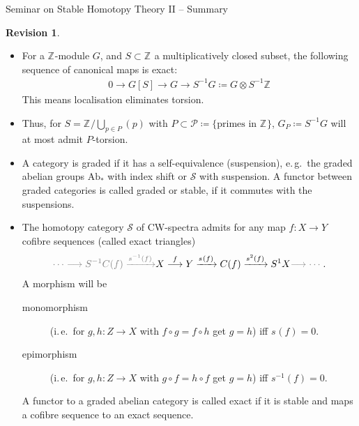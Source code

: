 \documentclass[english]{scrartcl}
\theoremstyle{definition}
\newtheorem*{Rev}{Revision}
\theoremstyle{remark}
\newcommand*{\idest}{i.\,e.\ }
\newcommand*{\forexample}{e.\,g.\ }
\newcommand*{\ifftext}{iff}
\newcommand*{\Z}[1][]{\mathds{Z}_{#1}}  %
\newcommand*{\longto}{\longrightarrow}
\newcommand*{\Cone}[1]{C(#1)}
\newcommand*{\Spectra}{\mathcal{S}} %
\newcommand*{\Sph}{S} %
\newcommand*{\susp}[2][1]{\Sph^{#1}#2}  %
\newcommand*{\conem}[2][]{s^{#1}(#2)}  %
\newcommand*{\Ps}{P}  %
\newcommand*{\PS}{\mathcal{P}} %
\newcommand*{\graded}[1]{#1_*}  %
\newcommand*{\Abgr}{\graded{\text{Ab}}}  %
\begin{document}
\clearpairofpagestyles
{}
\cfoot*{\pagemark}

\begin{center}
Seminar on Stable Homotopy Theory II – Summary\par
\end{center}
\smallskip


\begin{Rev}
  \begin{itemize}
  \item For a $\Z$-module $G$, and $S\subset\Z$ a multiplicatively
    closed subset, the following sequence of canonical maps is exact:
    \begin{gather*}
      0 \longto G[S] \longto G \longto S^{-1}G\coloneqq G\otimes
      S^{-1}\Z
    \end{gather*}
    This means localisation eliminates torsion.
  \item Thus, for $S=\Z/\bigcup_{p\in\Ps}(p)$ with
    $\Ps\subset\PS\coloneqq\{\text{primes in $\Z$}\}$,
    $G_P\coloneqq S^{-1}G$ will at most admit $P$-torsion.
  \item A category is graded if it has a self-equivalence
    (suspension), \forexample the graded abelian groups $\Abgr$ with
    index shift or $\Spectra$ with suspension. A functor between
    graded categories is called graded or stable, if it commutes with
    the suspensions.
  \item The homotopy category $\Spectra$ of CW-spectra admits for any
    map $f\colon X\to Y$ cofibre sequences (called exact triangles)
    \begin{gather*}
      {\color{gray} \dotsb \longto \susp[-1] \Cone f
        \xrightarrow{\conem[-1] f} } X \overset f \longrightarrow Y
      \xrightarrow{\conem f} \Cone f \xrightarrow{\conem[2]f} \susp X
      {\color{gray} \longto \dotsb } \;.
    \end{gather*}
    A morphism will be
    \begin{description}
    \item[monomorphism] (\idest for $g,h\colon Z\to X$ with
      $f\circ g=f\circ h$ get $g=h$) \ifftext{} $\conem f=0$.
    \item[epimorphism] (\idest for $g,h\colon Z\to X$ with
      $g\circ f=h\circ f$ get $g=h$) \ifftext{} $\conem[-1] f = 0$.
    \end{description}
    A functor to a graded abelian category is called exact if it is
    stable and maps a cofibre sequence to an exact sequence.
  \end{itemize}
\end{Rev}
\end{document}
